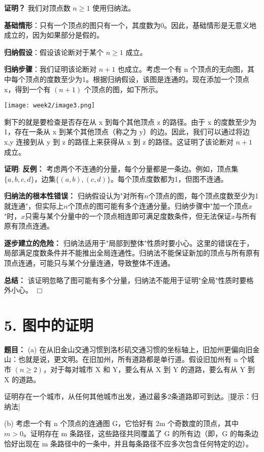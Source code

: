 \documentclass[11pt]{article}
\def\endproofmark{$\Box$}
\newenvironment{proof}{\par{\bf 证明}:}{\endproofmark\smallskip}
\begin{document}
\textbf{证明？} 我们对顶点数 $n\ge1$ 使用归纳法。

\textbf{基础情形}：只有一个顶点的图只有一个，其度数为0。因此，基础情形是无意义地成立的，因为如果部分是假的。

\textbf{归纳假设}：假设该论断对于某个 $n\ge1$ 成立。

\textbf{归纳步骤}：我们证明该论断对 $n+1$ 也成立。考虑一个有 n 个顶点的无向图，其中每个顶点的度数至少为1。根据归纳假设，该图是连通的。现在添加一个顶点 x，得到一个有 $(n+1)$ 个顶点的图，如下所示。

\begin{center}
\texttt{[image: week2/image3.png]}
\end{center}

剩下的就是要检查是否存在从 x 到每个其他顶点 z 的路径。由于 x 的度数至少为1，存在一条从 x 到某个其他顶点（称之为 y）的边。因此，我们可以通过将边 {x,y} 连接到从 y 到 z 的路径上来获得从 x 到 z 的路径。这证明了该论断对 $n+1$ 成立。

\begin{proof}
\textbf{反例：}
考虑两个不连通的分量，每个分量都是一条边。例如，顶点集$\{a,b,c,d\}$，边集$\{(a,b),(c,d)\}$。每个顶点度数都为1，但图不连通。

\textbf{归纳法的根本性错误：}
归纳假设认为"对所有$n$个顶点的图，每个顶点度数至少为1就连通"，但实际上$n$个顶点的图可能有多个连通分量。归纳步骤中"加一个顶点$x$"时，$x$只需与某个分量中的一个顶点相连即可满足度数条件，但无法保证$x$与所有原有顶点连通。

\textbf{逐步建立的危险：}
归纳法适用于"局部到整体"性质时要小心。这里的错误在于，局部满足度数条件并不能推出全局连通性。归纳法不能保证新加的顶点与所有原有顶点连通，可能只与某个分量连通，导致整体不连通。

\textbf{总结：} 该证明忽略了图可能有多个分量，归纳法不能用于证明"全局"性质时要格外小心。
\end{proof}

\section*{5. 图中的证明}
\textbf{题目：}
(a) 在从旧金山交通习惯到洛杉矶交通习惯的坐标轴上，旧加州更偏向旧金山：也就是说，更文明。在旧加州，所有道路都是单行道。假设旧加州有 n 个城市 $(n\ge2)$，对于每对城市 X 和 Y，要么有从 X 到 Y 的道路，要么有从 Y 到 X 的道路。

证明存在一个城市，从任何其他城市出发，通过最多2条道路即可到达。[提示：归纳法]

(b) 考虑一个有 n 个顶点的连通图 G，它恰好有 2m 个奇数度的顶点，其中 $m>0$。证明存在 m 条路径，这些路径共同覆盖了 G 的所有边（即，G 的每条边恰好出现在 m 条路径中的一条中，并且每条路径不应多次包含任何特定的边）。
\end{document}
